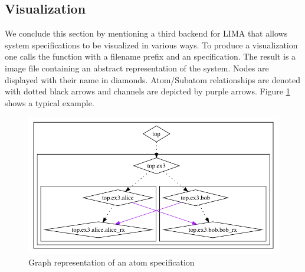\subsection{Visualization}\label{ssec:lima-visualization}

We conclude this section by mentioning a third backend for LIMA that allows
system specifications to be visualized in various ways. To produce a
visualization one calls the  function with a filename prefix and
an  specification. The result is a  image file containing an
abstract representation of the system. Nodes are displayed with their name in
diamonds. Atom/Subatom relationships are denoted with dotted black arrows and
channels are depicted by purple arrows. Figure \ref{fig:lima-visualization}
shows a typical example.

\begin{figure}
\includegraphics[scale=0.5]{periodic_ex3.png}
\caption{Graph representation of an atom specification}
\label{fig:lima-visualization}
\end{figure}




